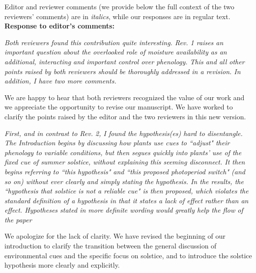 \documentclass[11pt,letter]{article}
\begin{document}
\setlength{\parindent}{0cm}
\setlength{\parskip}{7pt}

Editor and reviewer comments (we provide below the full context of the two reviewers' comments) are in \emph{italics}, while our responses are in regular text. \\ 

{\bf Response to editor's comments:} 

\begin{mybox}
\emph{Both reviewers found this contribution quite interesting. Rev. 1 raises an important question about the overlooked role of moisture availability as an additional, interacting and important control over phenology. This and all other points raised by both reviewers should be thoroughly addressed in a revision. In addition, I have two more comments.}
\end{mybox}

We are happy to hear that both reviewers recognized the value of our work and we appreciate the opportunity to revise our manuscript. We have worked to clarify the points raised by the editor and the two reviewers in this new version. \\

\begin{mybox}
\emph{First, and in contrast to Rev. 2, I found the hypothesis(es) hard to disentangle. The Introduction begins by discussing how plants use cues to ``adjust" their phenology to variable conditions, but then segues quickly into plants' use of the fixed cue of summer solstice, without explaining this seeming disconnect. It then begins referring to ``this hypothesis" and ``this proposed photoperiod switch" (and so on) without ever clearly and simply stating the hypothesis. In the results, the ``hypothesis that solstice is not a reliable cue" is then proposed, which violates the standard definition of a hypothesis in that it states a lack of effect rather than an effect. Hypotheses stated in more definite wording would greatly help the flow of the paper}
\end{mybox}

We apologize for the lack of clarity. We have revised the beginning of our introduction to clarify the transition between the general discussion of environmental cues and the specific focus on solstice, and to introduce the solstice hypothesis more clearly and explicitly.%
\end{document}
